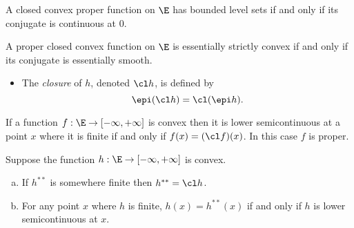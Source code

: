 \documentclass[../borwein-lewis_notes.tex]{subfiles}
\begin{document}
\begin{theorem}
A closed convex proper function on $\E$ has bounded level sets if 
and only if its conjugate is continuous at 0.
\label{4.2.4}
\end{theorem}
\begin{theorem}
A proper closed convex function on $\E$ is essentially strictly 
convex if and only if its conjugate is essentially smooth.
\label{4.2.5}
\end{theorem}
\begin{itemize}
\item The \textit{closure} of $h$, denoted $\cl h$, is defined by 
\begin{equation}
\epi(\cl h) = \cl(\epi h).
\label{4.1.6}
\end{equation}
\end{itemize}
\begin{proposition}
If a function $f:\E\to[-\infty, +\infty]$ is convex then it is lower
semicontinuous at a point $x$ where it is finite if and only if $f(x)
= (\cl f)(x)$. In this case $f$ is proper.
\label{4.2.7}
\end{proposition}
\begin{theorem}[4.2.8]
Suppose the function $h:\E\to[-\infty,+\infty]$ is convex.
\label{4.2.8}
\begin{enumerate}[(a)]
\item If $h^{**}$ is somewhere finite then $h^{**}=\cl h$.
\item For any point $x$ where $h$ is finite, $h(x)=h^{**}(x)$ if 
and only if $h$ is lower semicontinuous at $x$.
\end{enumerate}
\end{theorem}
\end{document}
